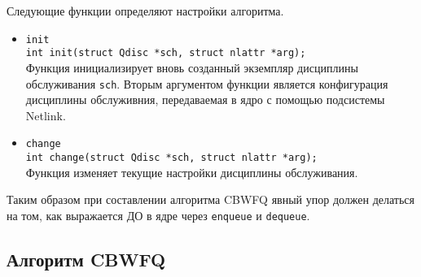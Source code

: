 	Следующие функции определяют настройки алгоритма.
	\begin{itemize}
		\item \lstinline{init}\\
			  \lstinline{int init(struct Qdisc *sch, struct nlattr *arg);}\\
			  Функция инициализирует вновь созданный экземпляр дисциплины обслуживания \texttt{sch}.
			  Вторым аргументом функции является конфигурация дисциплины обслуживния, передаваемая
			  в ядро с помощью подсистемы Netlink.
		\item \lstinline{change}\\
			  \lstinline{int change(struct Qdisc *sch, struct nlattr *arg);}\\
			  Функция изменяет текущие настройки дисциплины обслуживания. 
	\end{itemize}

	Таким образом при составлении алгоритма CBWFQ явный упор должен делаться на том, как выражается
	ДО в ядре через \lstinline{enqueue} и \lstinline{dequeue}.

	\subsection{Алгоритм CBWFQ}
	


